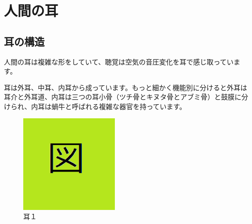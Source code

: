 \documentclass[11pt,b5paper,papersize,dvipdfmx]{jsbook}
\begin{document}
\section{人間の耳}
%
\subsection{耳の構造}
人間の耳は複雑な形をしていて、聴覚は空気の音圧変化を耳で感じ取っています。\par
耳は外耳、中耳、内耳から成っています。もっと細かく機能別に分けると外耳は耳介と外耳道、内耳は三つの耳小骨（ツチ骨とキヌタ骨とアブミ骨）と鼓膜に分けられ、内耳は蝸牛と呼ばれる複雑な器官を持っています。
\begin{figure}[H]
  \centering
  \includegraphics[width=5cm]{nsmr/img/zu.png}
  \caption{耳１}
\end{figure}

%
\end{document}

